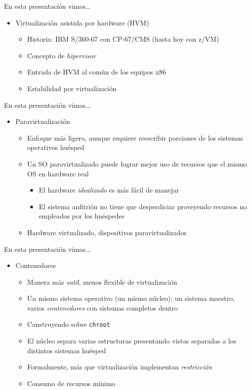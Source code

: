 \documentclass[presentation]{beamer}
\begin{document}
\begin{frame}[label={sec:org3888936}]{En esta presentación vimos\ldots{}}
\begin{itemize}
\item Virtualización asistida por hardware (HVM)
\begin{itemize}
\item Historia: IBM S/360-67 con CP-67/CMS (hasta hoy con z/VM)
\item Concepto de \emph{hipervisor}
\item Entrada de HVM al común de los equipos x86
\item Estabilidad por virtualización
\end{itemize}
\end{itemize}
\end{frame}

\begin{frame}[label={sec:org1535f4b}]{En esta presentación vimos\ldots{}}
\begin{itemize}
\item Paravirtualización
\begin{itemize}
\item Enfoque más ligero, aunque requiere reescribir porciones de los
sistemas operativos huésped
\item Un SO paravirtualizado puede lograr mejor uso de recursos que el
mismo OS en hardware real
\begin{itemize}
\item El hardware \emph{idealizado} es más fácil de manejar
\item El sistema anfitrión no tiene que desperdiciar proveyendo
recursos no empleados por los huéspedes
\end{itemize}
\item Hardware virtualizado, dispositivos paravirtualizados
\end{itemize}
\end{itemize}
\end{frame}

\begin{frame}[label={sec:orgb3ce68f},fragile]{En esta presentación vimos\ldots{}}
 \begin{itemize}
\item Contenedores
\begin{itemize}
\item Manera más \emph{sutil}, menos flexible de virtualización
\item Un mismo sistema operativo (un mismo núcleo); un sistema maestro,
varios \emph{contenedores} con sistemas completos dentro
\item Construyendo sobre \texttt{chroot}
\item El núcleo separa varias estructuras presentando vistas separadas a
los distintos sistemas huésped
\item Formalmente, más que virtualización implementan \emph{restricción}
\item Consumo de recursos mínimo
\end{itemize}
\end{itemize}
\end{frame}
\end{document}
